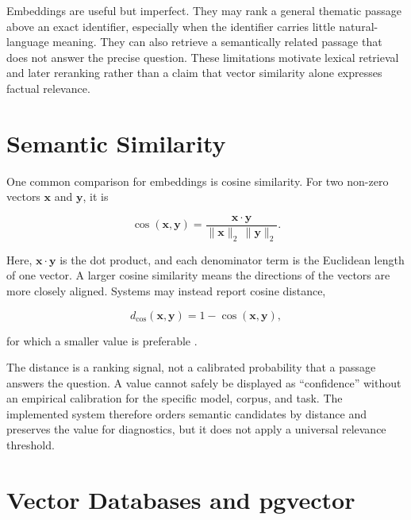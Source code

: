 Embeddings are useful but imperfect. They may rank a general thematic passage above an exact identifier, especially when the identifier carries little natural-language meaning. They can also retrieve a semantically related passage that does not answer the precise question. These limitations motivate lexical retrieval and later reranking rather than a claim that vector similarity alone expresses factual relevance.

\section{Semantic Similarity}
\label{sec:background-cosine}

One common comparison for embeddings is cosine similarity. For two non-zero vectors $\mathbf{x}$ and $\mathbf{y}$, it is

\begin{equation}
    \operatorname{cos}(\mathbf{x},\mathbf{y}) =
    \frac{\mathbf{x}\cdot\mathbf{y}}
    {\lVert\mathbf{x}\rVert_2\,\lVert\mathbf{y}\rVert_2}.
    \label{eq:cosine-similarity}
\end{equation}

Here, $\mathbf{x}\cdot\mathbf{y}$ is the dot product, and each denominator term is the Euclidean length of one vector. A larger cosine similarity means the directions of the vectors are more closely aligned. Systems may instead report cosine distance,

\begin{equation}
    d_{\mathrm{cos}}(\mathbf{x},\mathbf{y}) =
    1 - \operatorname{cos}(\mathbf{x},\mathbf{y}),
    \label{eq:cosine-distance}
\end{equation}

for which a smaller value is preferable \cite{Manning2008IR}.

The distance is a ranking signal, not a calibrated probability that a passage answers the question. A value cannot safely be displayed as ``confidence'' without an empirical calibration for the specific model, corpus, and task. The implemented system therefore orders semantic candidates by distance and preserves the value for diagnostics, but it does not apply a universal relevance threshold.

\section{Vector Databases and pgvector}
\label{sec:background-pgvector}


